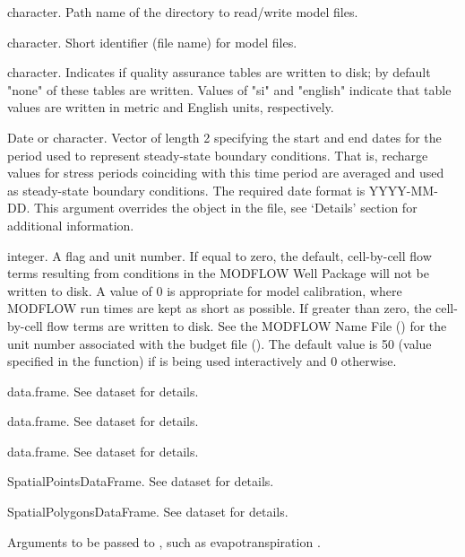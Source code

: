 \documentclass[a4paper]{book}
\begin{document}
\begin{Arguments}
\begin{ldescription}
\item[\code{dir.run}] character.
Path name of the directory to read/write model files.

\item[\code{id}] character.
Short identifier (file name) for model files.

\item[\code{qa.tables}] character.
Indicates if quality assurance tables are written to disk;
by default "none" of these tables are written.
Values of "si" and "english" indicate that table values are written in
metric and English units, respectively.

\item[\code{ss.interval}] Date or character.
Vector of length 2 specifying the start and end dates for the period used to
represent steady-state boundary conditions.
That is, recharge values for stress periods coinciding with this time period are
averaged and used as steady-state boundary conditions.
The required date format is YYYY-MM-DD.
This argument overrides the  object in the  file,
see `Details' section for additional information.

\item[\code{iwelcb}] integer.
A flag and unit number.
If equal to zero, the default, cell-by-cell flow terms resulting from
conditions in the MODFLOW Well Package will not be written to disk.
A value of 0 is appropriate for model calibration,
where MODFLOW run times are kept as short as possible.
If greater than zero, the cell-by-cell flow terms are written to disk.
See the MODFLOW Name File () for the unit number associated with
the budget file ().
The default value is 50 (value specified in the  function)
if \R{} is being used interactively and 0 otherwise.

\item[\code{canal.seep}] data.frame.
See  dataset for details.

\item[\code{efficiency}] data.frame.
See  dataset for details.

\item[\code{gage.disch}] data.frame.
See  dataset for details.

\item[\code{pod.wells}] SpatialPointsDataFrame.
See  dataset for details.

\item[\code{tributaries}] SpatialPolygonsDataFrame.
See  dataset for details.

\item[\code{...}] Arguments to be passed to , such as evapotranspiration .
\end{ldescription}
\end{Arguments}
\end{document}
